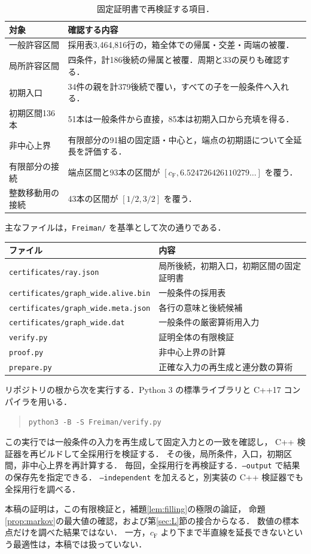 \documentclass[11pt,a4paper]{article}
\theoremstyle{definition}
\newcommand{\CF}{c_{\mathrm F}}
\newcommand{\file}[1]{{\small\nolinkurl{#1}}}
\begin{document}
\begin{table}[htbp]
\centering\small
\begin{tabular}{p{}p{}}
\toprule
対象 & 確認する内容\\
\midrule
一般許容区間 & 採用表3,464,816行の，箱全体での帰属・交差・両端の被覆．\\
局所許容区間 & 四条件，計186後続の帰属と被覆．周期と33の戻りも確認する．\\
初期入口 & 34件の親を計379後続で覆い，すべての子を一般条件へ入れる．\\
初期区間136本 & 51本は一般条件から直接，85本は初期入口から充填を得る．\\
非中心上界 & 有限部分の91組の固定語・中心と，端点の初期語について全延長を評価する．\\
有限部分の接続 & 端点区間と93本の区間が $[\CF,6.524726426110279\ldots]$ を覆う．\\
整数移動用の接続 & 43本の区間が $[1/2,3/2]$ を覆う．\\
\bottomrule
\end{tabular}
\caption{固定証明書で再検証する項目．}\label{tab:verification}
\end{table}

主なファイルは，\file{Freiman/} を基準として次の通りである．
\begin{center}\small
\begin{tabular}{p{}p{}}
\toprule
ファイル & 内容\\
\midrule
\file{certificates/ray.json} & 局所後続，初期入口，初期区間の固定証明書\\
\file{certificates/graph_wide.alive.bin} & 一般条件の採用表\\
\file{certificates/graph_wide.meta.json} & 各行の意味と後続候補\\
\file{certificates/graph_wide.dat} & 一般条件の厳密算術用入力\\
\file{verify.py} & 証明全体の有限検証\\
\file{proof.py} & 非中心上界の計算\\
\file{prepare.py} & 正確な入力の再生成と連分数の算術\\
\bottomrule
\end{tabular}
\end{center}

リポジトリの根から次を実行する．Python 3 の標準ライブラリと
C++17 コンパイラを用いる．
\begin{quote}\small
\verb|python3 -B -S Freiman/verify.py|
\end{quote}
この実行では一般条件の入力を再生成して固定入力との一致を確認し，
C++ 検証器を再ビルドして全採用行を検証する．
その後，局所条件，入口，初期区間，非中心上界を再計算する．
毎回，全採用行を再検証する．\texttt{--output} で結果の保存先を指定できる．
\texttt{--independent} を加えると，別実装の C++ 検証器でも全採用行を調べる．

本稿の証明は，この有限検証と，補題\ref{lem:filling}の極限の論証，
命題\ref{prop:markov}の最大値の確認，および第\ref{sec:L}節の接合からなる．
数値の標本点だけを調べた結果ではない．
一方，$\CF$ より下まで半直線を延長できないという最適性は，本稿では扱っていない．
\end{document}
